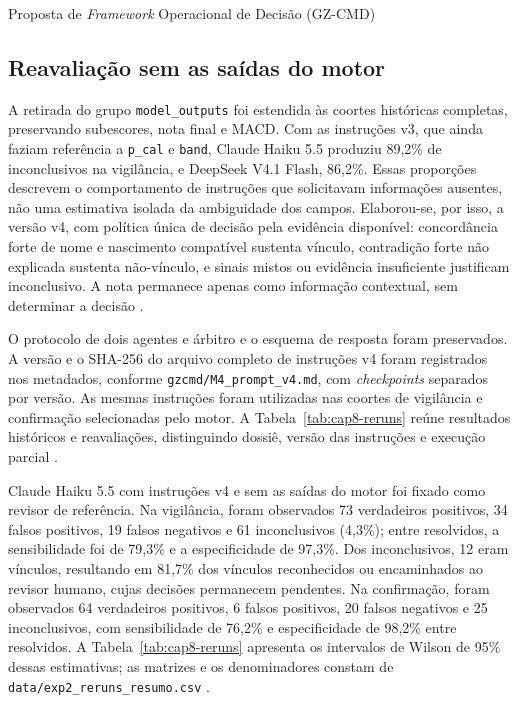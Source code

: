 \begin{chapter}{Proposta de \textit{Framework} Operacional de Decisão (GZ-CMD)}
\subsection{Reavaliação sem as saídas do motor}
\label{sec:cap8-reruns}

A retirada do grupo \texttt{model\_outputs} foi estendida às coortes históricas completas, preservando subescores, nota final e MACD. Com as instruções v3, que ainda faziam referência a \texttt{p\_cal} e \texttt{band}, Claude Haiku 5.5 produziu 89,2\% de inconclusivos na vigilância, e DeepSeek V4.1 Flash, 86,2\%. Essas proporções descrevem o comportamento de instruções que solicitavam informações ausentes, não uma estimativa isolada da ambiguidade dos campos. Elaborou-se, por isso, a versão v4, com política única de decisão pela evidência disponível: concordância forte de nome e nascimento compatível sustenta vínculo, contradição forte não explicada sustenta não-vínculo, e sinais mistos ou evidência insuficiente justificam inconclusivo. A nota permanece apenas como informação contextual, sem determinar a decisão \cite{Jardim2026phdrepo}.

O protocolo de dois agentes e árbitro e o esquema de resposta foram preservados. A versão e o SHA-256 do arquivo completo de instruções v4 foram registrados nos metadados, conforme \texttt{gzcmd/M4\_prompt\_v4.md}, com \textit{checkpoints} separados por versão. As mesmas instruções foram utilizadas nas coortes de vigilância e confirmação selecionadas pelo motor. A Tabela~\ref{tab:cap8-reruns} reúne resultados históricos e reavaliações, distinguindo dossiê, versão das instruções e execução parcial \cite{Jardim2026phdrepo}.



Claude Haiku 5.5 com instruções v4 e sem as saídas do motor foi fixado como revisor de referência. Na vigilância, foram observados 73 verdadeiros positivos, 34 falsos positivos, 19 falsos negativos e 61 inconclusivos (4,3\%); entre resolvidos, a sensibilidade foi de 79,3\% e a especificidade de 97,3\%. Dos inconclusivos, 12 eram vínculos, resultando em 81,7\% dos vínculos reconhecidos ou encaminhados ao revisor humano, cujas decisões permanecem pendentes. Na confirmação, foram observados 64 verdadeiros positivos, 6 falsos positivos, 20 falsos negativos e 25 inconclusivos, com sensibilidade de 76,2\% e especificidade de 98,2\% entre resolvidos. A Tabela~\ref{tab:cap8-reruns} apresenta os intervalos de Wilson de 95\% dessas estimativas; as matrizes e os denominadores constam de \texttt{data/exp2\_reruns\_resumo.csv} \cite{Jardim2026phdrepo}.


\end{chapter}
